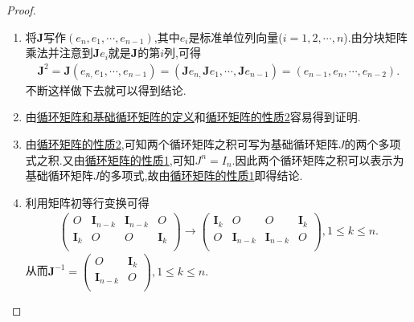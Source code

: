 \documentclass[lang=cn,newtx,10pt,scheme=chinese]{elegantbook}
\begin{document}
\begin{proof}
\begin{enumerate}
\item 将$\boldsymbol{J}$写作$(e_n,e_1,\cdots,e_{n-1})$,其中$e_i$是标准单位列向量($i=1,2,\cdots,n$).由分块矩阵乘法并注意到$\boldsymbol{J}e_i$就是$\boldsymbol{J}$的第$i$列,可得
\begin{align*}
\boldsymbol{J}^2=\boldsymbol{J}\left( e_{n,}e_1,\cdots ,e_{n-1} \right) =\left( \boldsymbol{J}e_{n,}\boldsymbol{J}e_1,\cdots ,\boldsymbol{J}e_{n-1} \right) =\left( e_{n-1},e_n,\cdots ,e_{n-2} \right) .
\end{align*}
不断这样做下去就可以得到结论.
\item 由\hyperref[definition:循环矩阵]{循环矩阵和基础循环矩阵的定义}和\hyperref[proposition:循环矩阵的性质]{循环矩阵的性质2}容易得到证明.
\item 由\hyperref[proposition:循环矩阵的性质]{循环矩阵的性质2},可知两个循环矩阵之积可写为基础循环矩阵$J$的两个多项式之积.又由\hyperref[proposition:循环矩阵的性质]{循环矩阵的性质1},可知$J^n=I_n$.因此两个循环矩阵之积可以表示为基础循环矩阵$J$的多项式,故由\hyperref[proposition:循环矩阵的性质]{循环矩阵的性质1}即得结论.
\item 利用矩阵初等行变换可得
\begin{align*}
\left( \begin{matrix}
O&		\boldsymbol{I}_{n-k}&		\boldsymbol{I}_{n-k}&		O\\
\boldsymbol{I}_k&		O&		O&		\boldsymbol{I}_k\\
\end{matrix} \right) \rightarrow \left( \begin{matrix}
\boldsymbol{I}_k&		O&		O&		\boldsymbol{I}_k\\
O&		\boldsymbol{I}_{n-k}&		\boldsymbol{I}_{n-k}&		O\\
\end{matrix} \right) ,1\le k\le n.
\end{align*}
从而$\boldsymbol{J}^{-1}=\left( \begin{matrix}
O&		\boldsymbol{I}_k\\
\boldsymbol{I}_{n-k}&		O\\
\end{matrix} \right) ,1\le k\le n.$
\end{enumerate}
\end{proof}
\end{document}

